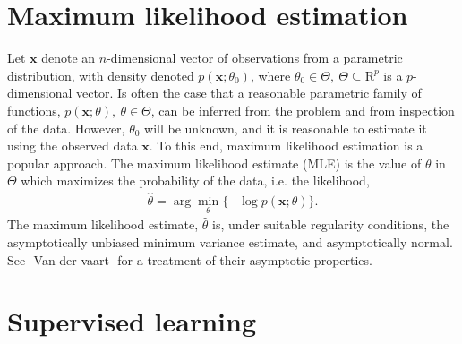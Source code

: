 
\section{Maximum likelihood estimation}

Let $\mathbf{x}$ denote an $n$-dimensional vector of observations from a parametric distribution, with density denoted $p(\mathbf{x};\theta_0)$, where $\theta_0\in \Theta,~\Theta\subseteq \mathrm{R}^p$ is a $p$-dimensional vector.
Is often the case that a reasonable parametric family of functions, $p(\mathbf{x};\theta),~\theta\in \Theta$, can be inferred from the problem and from inspection of the data.
However, $\theta_0$ will be unknown, and it is reasonable to estimate it using the observed data $\mathbf{x}$.
To this end, maximum likelihood estimation is a popular approach.
The maximum likelihood estimate (MLE) is the value of $\theta$ in $\Theta$ which maximizes the probability of the data, i.e. the likelihood, 
\begin{align}
	\hat{\theta} = \arg\min_\theta \{-\log p(\mathbf{x};\theta)\}.
\end{align}
The maximum likelihood estimate, $\hat{\theta}$ is, under suitable regularity conditions, the asymptotically unbiased minimum variance estimate, and asymptotically normal.
See -Van der vaart- for a treatment of their asymptotic properties.


\section{Supervised learning}

